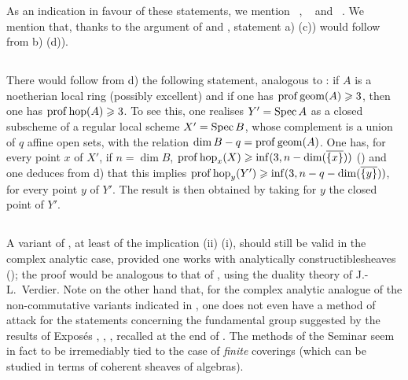 As an indication in favour of these statements, we mention ~, ~ and ~. We mention that, thanks to the argument of  and , statement a) (\resp c)) would follow from b) (\resp d)).

\subsection{} \label{XIV.6.3}
There would follow from d) the following statement, analogous to : if $A$ is a noetherian local ring (possibly excellent) and if one has $\operatorname{prof} \operatorname{geom} (A) \geqslant 3$, then one has $\operatorname{prof} \operatorname{hop} (A) \geqslant 3$. To see this, one realises $Y'=\operatorname{Spec} A$ as a closed subscheme of a regular local scheme $X'=\operatorname{Spec} B$, whose complement is a union of $q$ affine open sets, with the relation $\dim B -q=\operatorname{prof} \operatorname{geom}(A)$. One has, for every point $x$ of $X'$, if $n=\dim B$, $\operatorname{prof} \operatorname{hop}_x(X) \geqslant \inf(3, n-\dim(\overline{\{x\}}))$ (\cf {}) and one deduces from d) that this implies $\operatorname{prof} \operatorname{hop}_y(Y') \geqslant \inf(3, n-q-\dim(\overline{\{y\}}))$, for every point $y$ of $Y'$. The result is then obtained by taking for $y$ the closed point of $Y'$.

\subsection{} \label{XIV.6.4}
A variant of , at least of the implication \textup{(ii)} \ALORS \textup{(i)}, should still be valid in the complex analytic case, provided one works with \og analytically constructible\fg sheaves (\cf {}); the proof would be analogous to that of , using the duality theory of J.-L.~Verdier. Note on the other hand that, for the complex analytic analogue of the non-commutative variants indicated in , one does not even have a method of attack for the statements concerning the fundamental group suggested by the results of Expos\'es , , , recalled at the end of . The methods of the Seminar seem in fact to be irremediably tied to the case of \emph{finite} coverings (which can be studied in terms of coherent sheaves of algebras).

